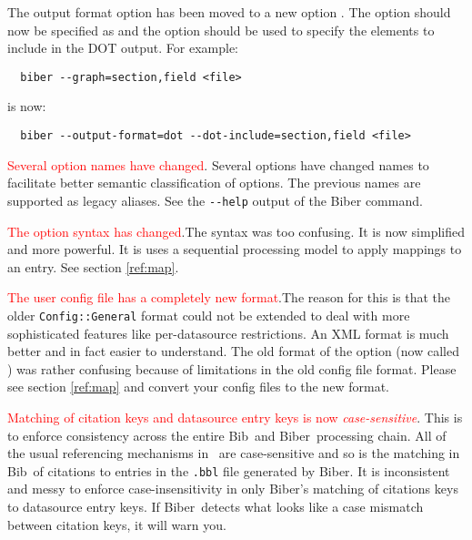 \documentclass{ltxdockit}
\newcommand*{\biber}{Biber\xspace}
\begin{document}
The output format option  has been moved to a
new option . The option  should now be
specified as  and the \linebreak{} option
should be used to specify the elements to include in the DOT output. For
example:

\begin{verbatim}
  biber --graph=section,field <file>
\end{verbatim}

\noindent is now:

\begin{verbatim}
  biber --output-format=dot --dot-include=section,field <file>
\end{verbatim}

\textcolor{red}{Several option names have changed}. Several options have
changed names to facilitate better semantic classification of options. The
previous names are supported as legacy aliases. See the \verb+--help+
output of the \biber command.

\textcolor{red}{The  option syntax has changed}.The syntax
was too confusing. It is now simplified and more powerful. It is uses a
sequential processing model to apply mappings to an entry. See section
\ref{ref:map}.

\textcolor{red}{The user config file has a completely new format}.The
  reason for this is that the older \verb+Config::General+ format
  could not be extended to deal with more sophisticated features like
  per-datasource restrictions. An XML format is much better and in
  fact easier to understand. The old format of the  option
  (now called ) was rather confusing because
  of limitations in the old config file format. Please see section
  \ref{ref:map} and convert your config files to the new format.

\textcolor{red}{Matching of citation keys and datasource entry keys is now
  \emph{case-sensitive}}. This is to enforce consistency across the entire
Bib\latex\ and \biber\ processing chain. All of the usual referencing
mechanisms in \latex\ are case-sensitive and so is the matching in
Bib\latex\ of citations to entries in the \texttt{.bbl} file generated by
\biber. It is inconsistent and messy to enforce case-insensitivity in only
\biber's matching of citations keys to datasource entry keys. If \biber\
detects what looks like a case mismatch between citation keys, it will warn
you.
\end{document}
